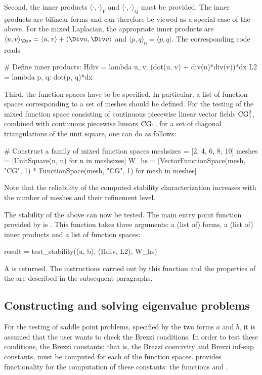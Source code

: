 Second, the inner products $\langle \cdot, \cdot \rangle_V$ and
$\langle \cdot, \cdot \rangle_Q$ must be provided. The inner products
are bilinear forms and can therefore be viewed as a special case of
the above. For the mixed Laplacian, the appropriate inner products are
$\langle u, v \rangle_{\Div} = \langle u, v \rangle + \langle \Div u,
\Div v \rangle$ and $\langle p, q \rangle_0 = \langle p, q \rangle$. The
corresponding code reads
\begin{python}
  # Define inner products:
  Hdiv = lambda u, v: (dot(u, v) + div(u)*div(v))*dx
  L2 = lambda p, q: dot(p, q)*dx
\end{python}

Third, the function spaces have to be specified. In particular, a list
of function spaces corresponding to a set of meshes should be defined.
For the testing of the mixed function space consisting of continuous
piecewise linear vector fields $\mathrm{CG}_1^2$, combined with
continuous piecewise linears $\mathrm{CG}_1$, for a set of diagonal
triangulations of the unit square, one can do as follows:
\begin{python}
  # Construct a family of mixed function spaces
  meshsizes = [2, 4, 6, 8, 10]
  meshes = [UnitSquare(n, n) for n in meshsizes]
  W_hs = [VectorFunctionSpace(mesh, "CG", 1) * FunctionSpace(mesh, "CG", 1)
          for mesh in meshes]
\end{python}
Note that the reliability of the computed stability characterization
increases with the number of meshes and their refinement level.

The stability of the above can now be tested. The main entry point
function provided by \rognesascot{} is . This
function takes three arguments: a (list of) forms, a (list of) inner
products and a list of function spaces:
\begin{python}
  result = test_stability((a, b), (Hdiv, L2), W_hs)
\end{python}
A  is returned.  The instructions carried out
by this function and the properties of the 
are described in the subsequent paragraphs.

\subsection{Constructing and solving eigenvalue problems}

For the testing of saddle point problems, specified by the two forms
$a$ and $b$, it is assumed that the user wants to check the Brezzi
conditions. In order to test these conditions, the Brezzi constants;
that is, the Brezzi coercivity and Brezzi inf-sup constants, must be
computed for each of the function spaces. \rognesascot{} provides
functionality for the computation of these constants: the functions
 and
.

